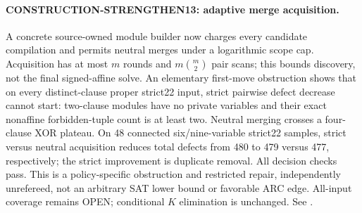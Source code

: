 \paragraph{CONSTRUCTION-STRENGTHEN13: adaptive merge acquisition.}
A concrete source-owned module builder now charges every candidate compilation
and permits neutral merges under a logarithmic scope cap. Acquisition has
at most $m$ rounds and $m\binom m2$ pair scans; this bounds discovery,
not the final signed-affine solve. An elementary first-move obstruction
shows that on every distinct-clause proper strict22 input, strict pairwise
defect decrease cannot start: two-clause modules have no private variables
and their exact nonaffine forbidden-tuple count is at least two.
Neutral merging crosses a four-clause XOR plateau. On 48 connected
six/nine-variable strict22 samples, strict versus neutral acquisition
reduces total defects from 480 to 479 versus 477, respectively;
the strict improvement is duplicate removal. All decision checks pass.
This is a policy-specific obstruction and restricted repair, independently
unrefereed, not an arbitrary SAT lower bound or favorable ARC edge.
All-input coverage remains OPEN; conditional $K$ elimination is unchanged.
See .


